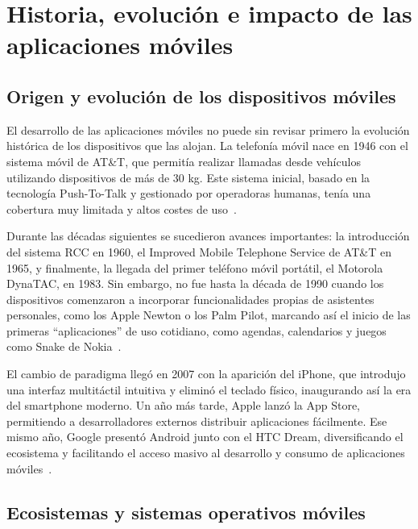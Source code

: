 


\section{Historia, evolución e impacto de las aplicaciones móviles}

\subsection{Origen y evolución de los dispositivos móviles}

El desarrollo de las aplicaciones móviles no puede sin revisar primero la evolución histórica de los dispositivos que las alojan. La telefonía móvil nace en 1946 con el sistema móvil de AT\&T, que permitía realizar llamadas desde vehículos utilizando dispositivos de más de 30 kg. Este sistema inicial, basado en la tecnología Push-To-Talk y gestionado por operadoras humanas, tenía una cobertura muy limitada y altos costes de uso~\cite{agar2004}.

Durante las décadas siguientes se sucedieron avances importantes: la introducción del sistema RCC en 1960, el Improved Mobile Telephone Service de AT\&T en 1965, y finalmente, la llegada del primer teléfono móvil portátil, el Motorola DynaTAC, en 1983. Sin embargo, no fue hasta la década de 1990 cuando los dispositivos comenzaron a incorporar funcionalidades propias de asistentes personales, como los Apple Newton o los Palm Pilot, marcando así el inicio de las primeras ``aplicaciones'' de uso cotidiano, como agendas, calendarios y juegos como Snake de Nokia~\cite{west2010}.

El cambio de paradigma llegó en 2007 con la aparición del iPhone, que introdujo una interfaz multitáctil intuitiva y eliminó el teclado físico, inaugurando así la era del smartphone moderno. Un año más tarde, Apple lanzó la App Store, permitiendo a desarrolladores externos distribuir aplicaciones fácilmente. Ese mismo año, Google presentó Android junto con el HTC Dream, diversificando el ecosistema y facilitando el acceso masivo al desarrollo y consumo de aplicaciones móviles~\cite{murphy2014}.

\subsection{Ecosistemas y sistemas operativos móviles}

